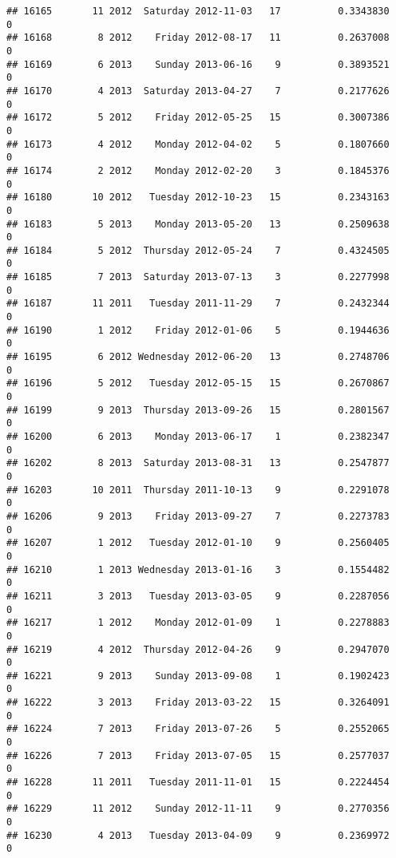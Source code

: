 \documentclass[
]{article}
\begin{document}
\begin{verbatim}
## 16165       11 2012  Saturday 2012-11-03   17          0.3343830             0
## 16168        8 2012    Friday 2012-08-17   11          0.2637008             0
## 16169        6 2013    Sunday 2013-06-16    9          0.3893521             0
## 16170        4 2013  Saturday 2013-04-27    7          0.2177626             0
## 16172        5 2012    Friday 2012-05-25   15          0.3007386             0
## 16173        4 2012    Monday 2012-04-02    5          0.1807660             0
## 16174        2 2012    Monday 2012-02-20    3          0.1845376             0
## 16180       10 2012   Tuesday 2012-10-23   15          0.2343163             0
## 16183        5 2013    Monday 2013-05-20   13          0.2509638             0
## 16184        5 2012  Thursday 2012-05-24    7          0.4324505             0
## 16185        7 2013  Saturday 2013-07-13    3          0.2277998             0
## 16187       11 2011   Tuesday 2011-11-29    7          0.2432344             0
## 16190        1 2012    Friday 2012-01-06    5          0.1944636             0
## 16195        6 2012 Wednesday 2012-06-20   13          0.2748706             0
## 16196        5 2012   Tuesday 2012-05-15   15          0.2670867             0
## 16199        9 2013  Thursday 2013-09-26   15          0.2801567             0
## 16200        6 2013    Monday 2013-06-17    1          0.2382347             0
## 16202        8 2013  Saturday 2013-08-31   13          0.2547877             0
## 16203       10 2011  Thursday 2011-10-13    9          0.2291078             0
## 16206        9 2013    Friday 2013-09-27    7          0.2273783             0
## 16207        1 2012   Tuesday 2012-01-10    9          0.2560405             0
## 16210        1 2013 Wednesday 2013-01-16    3          0.1554482             0
## 16211        3 2013   Tuesday 2013-03-05    9          0.2287056             0
## 16217        1 2012    Monday 2012-01-09    1          0.2278883             0
## 16219        4 2012  Thursday 2012-04-26    9          0.2947070             0
## 16221        9 2013    Sunday 2013-09-08    1          0.1902423             0
## 16222        3 2013    Friday 2013-03-22   15          0.3264091             0
## 16224        7 2013    Friday 2013-07-26    5          0.2552065             0
## 16226        7 2013    Friday 2013-07-05   15          0.2577037             0
## 16228       11 2011   Tuesday 2011-11-01   15          0.2224454             0
## 16229       11 2012    Sunday 2012-11-11    9          0.2770356             0
## 16230        4 2013   Tuesday 2013-04-09    9          0.2369972             0

\end{verbatim}
\end{document}
